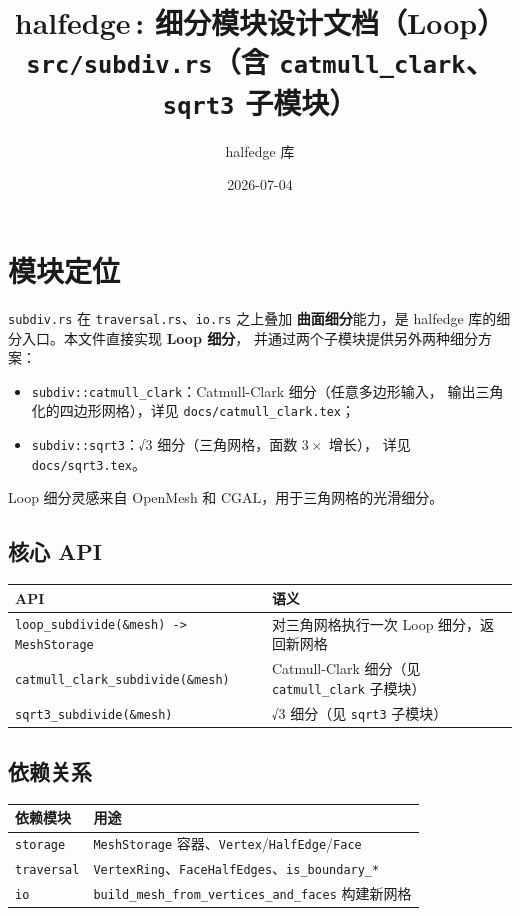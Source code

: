 \documentclass[11pt,a4paper]{article}
\title{\textbf{halfedge\,: 细分模块设计文档（Loop）} \\ \large \texttt{src/subdiv.rs}（含 \texttt{catmull\_clark}、\texttt{sqrt3} 子模块）}
\author{halfedge 库}
\date{2026-07-04}
\begin{document}
\maketitle
\tableofcontents

\section{模块定位}

\texttt{subdiv.rs} 在 \texttt{traversal.rs}、\texttt{io.rs} 之上叠加
\textbf{曲面细分}能力，是 halfedge 库的细分入口。本文件直接实现 \textbf{Loop 细分}，
并通过两个子模块提供另外两种细分方案：

\begin{itemize}
  \item \texttt{subdiv::catmull\_clark}：Catmull-Clark 细分（任意多边形输入，
        输出三角化的四边形网格），详见 \texttt{docs/catmull\_clark.tex}；
  \item \texttt{subdiv::sqrt3}：√3 细分（三角网格，面数 $3\times$ 增长），
        详见 \texttt{docs/sqrt3.tex}。
\end{itemize}

Loop 细分灵感来自 OpenMesh 和 CGAL，用于三角网格的光滑细分。

\subsection{核心 API}

\begin{center}
\begin{tabular}{@{}ll@{}}
  \toprule
  \textbf{API} & \textbf{语义} \\
  \midrule
  \texttt{loop\_subdivide(\&mesh) -> MeshStorage} & 对三角网格执行一次 Loop 细分，返回新网格 \\
  \texttt{catmull\_clark\_subdivide(\&mesh)} & Catmull-Clark 细分（见 \texttt{catmull\_clark} 子模块） \\
  \texttt{sqrt3\_subdivide(\&mesh)} & √3 细分（见 \texttt{sqrt3} 子模块） \\
  \bottomrule
\end{tabular}
\end{center}

\subsection{依赖关系}

\begin{center}
\begin{tabular}{@{}ll@{}}
  \toprule
  \textbf{依赖模块} & \textbf{用途} \\
  \midrule
  \texttt{storage} & \texttt{MeshStorage} 容器、\texttt{Vertex}/\texttt{HalfEdge}/\texttt{Face} \\
  \texttt{traversal} & \texttt{VertexRing}、\texttt{FaceHalfEdges}、\texttt{is\_boundary\_*} \\
  \texttt{io} & \texttt{build\_mesh\_from\_vertices\_and\_faces} 构建新网格 \\
  \bottomrule
\end{tabular}
\end{center}
\end{document}
